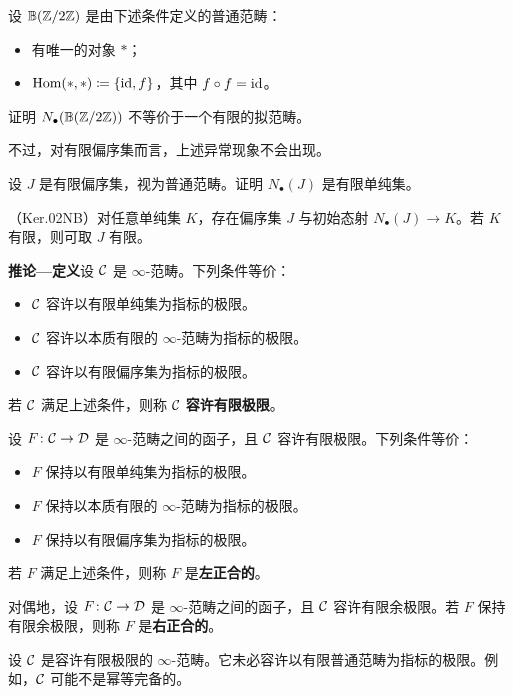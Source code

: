 \begin{exercise}\label{L10-1.7}
设 $\mathbb{B}(\mathbb{Z}/2\mathbb{Z})$ 是由下述条件定义的普通范畴：
\begin{itemize}[leftmargin=2.2em,itemsep=0.1em]
\item 有唯一的对象 $\ast$；
\item $\operatorname{Hom}(\ast,\ast)\coloneqq\{\operatorname{id},f\}$，其中 $f\circ f=\operatorname{id}$。
\end{itemize}
证明 $N_{\bullet}(\mathbb{B}(\mathbb{Z}/2\mathbb{Z}))$ 不等价于一个有限的拟范畴。
\end{exercise}

\nitem\label{L10-1.8} 不过，对有限偏序集而言，上述异常现象不会出现。

\begin{exercise}\label{L10-1.9}
设 $J$ 是有限偏序集，视为普通范畴。证明 $N_{\bullet}(J)$ 是有限单纯集。
\end{exercise}

\begin{proposition}\label{L10-1.10}
（Ker.02NB）对任意单纯集 $K$，存在偏序集 $J$ 与初始态射 $N_{\bullet}(J)\to K$。若 $K$ 有限，则可取 $J$ 有限。
\end{proposition}

\nitem\label{L10-1.11}\textbf{推论—定义}\quad 设 $\mathcal{C}$ 是 $\infty$-范畴。下列条件等价：
\begin{itemize}[leftmargin=2.2em,itemsep=0.1em]
\item $\mathcal{C}$ 容许以有限单纯集为指标的极限。
\item $\mathcal{C}$ 容许以本质有限的 $\infty$-范畴为指标的极限。
\item $\mathcal{C}$ 容许以有限偏序集为指标的极限。
\end{itemize}
若 $\mathcal{C}$ 满足上述条件，则称 $\mathcal{C}$ \textbf{容许有限极限}。

设 $F\colon\mathcal{C}\to\mathcal{D}$ 是 $\infty$-范畴之间的函子，且 $\mathcal{C}$ 容许有限极限。下列条件等价：
\begin{itemize}[leftmargin=2.2em,itemsep=0.1em]
\item $F$ 保持以有限单纯集为指标的极限。
\item $F$ 保持以本质有限的 $\infty$-范畴为指标的极限。
\item $F$ 保持以有限偏序集为指标的极限。
\end{itemize}
若 $F$ 满足上述条件，则称 $F$ 是\textbf{左正合的}。

对偶地，设 $F\colon\mathcal{C}\to\mathcal{D}$ 是 $\infty$-范畴之间的函子，且 $\mathcal{C}$ 容许有限余极限。若 $F$ 保持有限余极限，则称 $F$ 是\textbf{右正合的}。

\begin{warning}\label{L10-1.12}
设 $\mathcal{C}$ 是容许有限极限的 $\infty$-范畴。它未必容许以有限普通范畴为指标的极限。例如，$\mathcal{C}$ 可能不是幂等完备的。
\end{warning}


